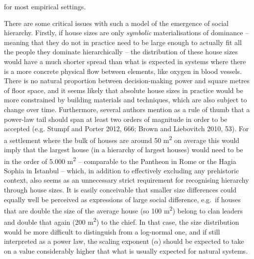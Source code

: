 \documentclass[
  12pt,
  a4paper, twoside]{book}
\begin{document}
for most empirical settings.

There are some critical issues with such a model of the emergence of social hierarchy. Firstly, if house sizes are only \emph{symbolic} materialisations of dominance -- meaning that they do not in practice need to be large enough to actually fit all the people they dominate hierarchically -- the distribution of these house sizes would have a much shorter spread than what is expected in systems where there is a more concrete physical flow between elements, like oxygen in blood vessels. There is no natural proportion between decision-making power and square metres of floor space, and it seems likely that absolute house sizes in practice would be more constrained by building materials and techniques, which are also subject to change over time. Furthermore, several authors mention as a rule of thumb that a power-law tail should span at least two orders of magnitude in order to be accepted (e.g. Stumpf and Porter 2012, 666; Brown and Liebovitch 2010, 53). For a settlement where the bulk of houses are around 50 m\textsuperscript{2} on average this would imply that the largest house (in a hierarchy of largest houses) would need to be in the order of 5.000 m\textsuperscript{2} -- comparable to the Pantheon in Rome or the Hagia Sophia in Istanbul -- which, in addition to effectively excluding any prehistoric context, also seems as an unnecessary strict requirement for recognising hierarchy through house sizes. It is easily conceivable that smaller size differences could equally well be perceived as expressions of large social difference, e.g.~if houses that are double the size of the average house (so 100 m\textsuperscript{2}) belong to clan leaders and double that again (200 m\textsuperscript{2}) to the chief. In that case, the size distribution would be more difficult to distinguish from a log-normal one, and if still interpreted as a power law, the scaling exponent (\(\alpha\)) should be expected to take on a value considerably higher that what is usually expected for natural systems.
\end{document}
